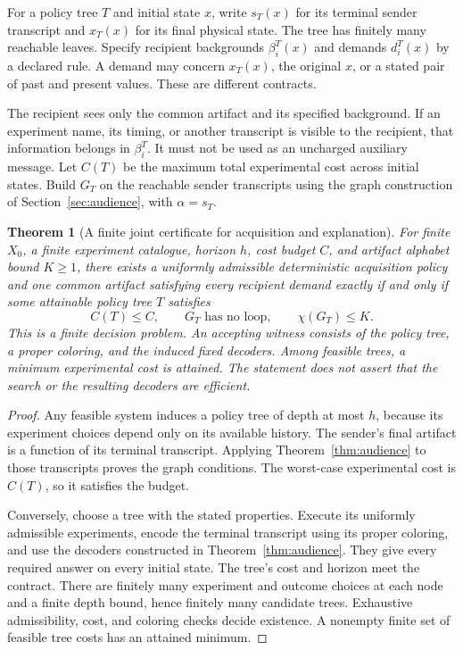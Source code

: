 \documentclass[11pt,letterpaper]{article}
\theoremstyle{plain}
\newtheorem{theorem}{Theorem}[section]
\theoremstyle{definition}
\begin{document}
For a policy tree $T$ and initial state $x$, write $s_T(x)$ for its terminal sender transcript and $x_T(x)$ for its final physical state. The tree has finitely many reachable leaves. Specify recipient backgrounds $\beta_i^T(x)$ and demands $d_i^T(x)$ by a declared rule. A demand may concern $x_T(x)$, the original $x$, or a stated pair of past and present values. These are different contracts.

The recipient sees only the common artifact and its specified background. If an experiment name, its timing, or another transcript is visible to the recipient, that information belongs in $\beta_i^T$. It must not be used as an uncharged auxiliary message. Let $C(T)$ be the maximum total experimental cost across initial states. Build $G_T$ on the reachable sender transcripts using the graph construction of Section~\ref{sec:audience}, with $\alpha=s_T$.

\begin{theorem}[A finite joint certificate for acquisition and explanation]\label{thm:joint-acquisition}
For finite $X_0$, a finite experiment catalogue, horizon $h$, cost budget $C$, and artifact alphabet bound $K\geq1$, there exists a uniformly admissible deterministic acquisition policy and one common artifact satisfying every recipient demand exactly if and only if some attainable policy tree $T$ satisfies
\[
C(T)\leq C,\qquad G_T\text{ has no loop},\qquad \chi(G_T)\leq K.
\]
This is a finite decision problem. An accepting witness consists of the policy tree, a proper coloring, and the induced fixed decoders. Among feasible trees, a minimum experimental cost is attained. The statement does not assert that the search or the resulting decoders are efficient.
\end{theorem}
\begin{proof}
Any feasible system induces a policy tree of depth at most $h$, because its experiment choices depend only on its available history. The sender's final artifact is a function of its terminal transcript. Applying Theorem~\ref{thm:audience} to those transcripts proves the graph conditions. The worst-case experimental cost is $C(T)$, so it satisfies the budget.

Conversely, choose a tree with the stated properties. Execute its uniformly admissible experiments, encode the terminal transcript using its proper coloring, and use the decoders constructed in Theorem~\ref{thm:audience}. They give every required answer on every initial state. The tree's cost and horizon meet the contract. There are finitely many experiment and outcome choices at each node and a finite depth bound, hence finitely many candidate trees. Exhaustive admissibility, cost, and coloring checks decide existence. A nonempty finite set of feasible tree costs has an attained minimum.
\end{proof}
\end{document}
